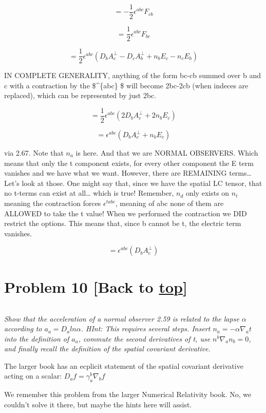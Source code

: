 \documentclass[landscape,letterpaper,10pt,english]{article}
\begin{document}
\[ = -\frac12 \epsilon^{abc} F_{cb} \]

\[ = \frac12 \epsilon^{abc} F_{bc} \]

\[ = \frac12 \epsilon^{abc} ( D_bA_c^\perp - D_cA_b^\perp + n_bE_c - n_cE_b ) \]

IN COMPLETE GENERALITY, anything of the form bc-cb summed over b and c
with a contraction by the \$\epsilon\^{}\{abc\} \$ will become 2bc-2cb
(when indeces are replaced), which can be represented by just 2bc.

\[ = \frac12 \epsilon^{abc} ( 2D_bA_c^\perp + 2n_bE_c ) \]

\[ = \epsilon^{abc} ( D_bA_c^\perp + n_bE_c ) \]

via 2.67. Note that \(n_a\) is here. And that we are NORMAL OBSERVERS.
Which means that only the t component exists, for every other component
the E term vanishes and we have what we want. However, there are
REMAINING terms\ldots{} Let's look at those. One might say that, since
we have the spatial LC tensor, that no t-terms can exist at all\ldots{}
which is true! Remember, \(n_d\) only exists on \(n_t\) meaning the
contraction forces \(\epsilon^{tabc}\), meaning of abc none of them are
ALLOWED to take the t value! When we performed the contraction we DID
restrict the options. This means that, since b cannot be t, the electric
term vanishes.

\[ = \epsilon^{abc} (D_bA_c^\perp ) \]

    \hypertarget{problem-10-back-to-top}{%
\section{\texorpdfstring{Problem 10 {[}Back to
\hyperref[toc]{top}{]}}{Problem 10 {[}Back to {]}}}\label{problem-10-back-to-top}}

\[\label{P10}\]

\emph{Show that the acceleration of a normal observer 2.59 is related to
the lapse \(\alpha\) according to \(a_a = D_a ln\alpha\). HInt: This
requires several steps. Insert \(n_a = -\alpha\nabla_a t\) into the
definition of \(a_a\), commute the second derivatives of t, use
\(n^b\nabla_an_b=0\), and finally recall the definition of the spatial
covariant derivative.}

    The larger book has an ecplicit statement of the spatial covariant
derivative acting on a scalar: \(D_a f = \gamma^b_a \nabla_b f\)

    We remember this problem from the larger Numerical Relativity book. No,
we couldn't solve it there, but maybe the hints here will assist.
\end{document}
